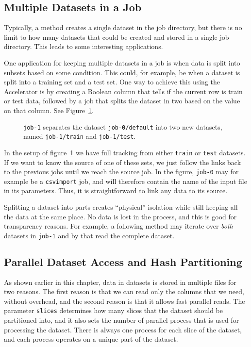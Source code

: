 \subsection{Multiple Datasets in a Job}

Typically, a method creates a single dataset in the job directory, but
there is no limit to how many datasets that could be created and
stored in a single job directory.  This leads to some interesting
applications.

One application for keeping multiple datasets in a job is when data is
split into subsets based on some condition.  This could, for example,
be when a dataset is split into a training set and a test set.  One
way to achieve this using the Accelerator is by creating a Boolean
column that tells if the current row is train or test data, followed
by a job that splits the dataset in two based on the value on that
column.  See Figure~\ref{fig:dep_dataset_csvimport_chain}.

\begin{figure}[h!]
  \hspace{1cm}
  
  \caption{\texttt{job-1} separates the dataset
    \texttt{job-0/default} into two new datasets, named
    \texttt{job-1/train} and \texttt{job-1/test}.}
  \label{fig:dep_dataset_csvimport_chain}
\end{figure}

In the setup of figure~\ref{fig:dep_dataset_csvimport_chain} we have
full tracking from either \texttt{train} or \texttt{test} datasets.
If we want to know the source of one of these sets, we just follow the
links back to the previous jobs until we reach the source job.  In the
figure, \texttt{job-0} may for example be a \texttt{csvimport} job,
and will therefore contain the name of the input file in its
parameters.  Thus, it is straightforward to link any data to its
source.

Splitting a dataset into parts creates ``physical'' isolation while
still keeping all the data at the same place.  No data is lost in the
process, and this is good for transparency reasons.  For example, a
following method may iterate over \textsl{both} datasets in
\texttt{job-1} and by that read the complete dataset.



\subsection{Parallel Dataset Access and Hash Partitioning}
As shown earlier in this chapter, data in datasets is stored in
multiple files for two reasons.  The first reason is that we can read
only the columns that we need, without overhead, and the second reason
is that it allows fast parallel reads.  The parameter \texttt{slices}
determines how many slices that the dataset should be partitioned
into, and it also sets the number of parallel process that is used for
processing the dataset.  There is always one process for each slice of
the dataset, and each process operates on a unique part of the
dataset.

